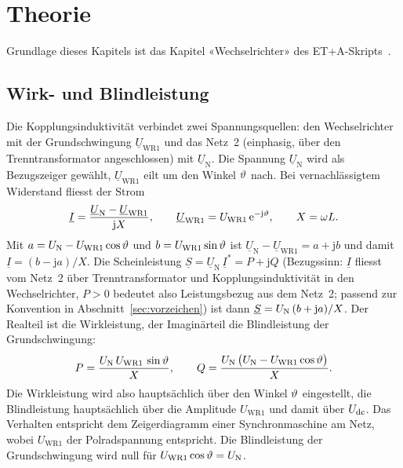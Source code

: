 \section{Theorie}
\label{sec:theorie}

Grundlage dieses Kapitels ist das Kapitel «Wechselrichter» des ET+A-Skripts~\cite{skript}.

\subsection{Wirk- und Blindleistung}

Die Kopplungsinduktivität verbindet zwei Spannungsquellen: den Wechselrichter mit der Grundschwingung $\underline{U}_{\mathrm{WR1}}$ und das Netz~2 (einphasig, über den Trenntransformator angeschlossen) mit $\underline{U}_{\mathrm N}$. Die Spannung $\underline{U}_{\mathrm N}$ wird als Bezugszeiger gewählt, $\underline{U}_{\mathrm{WR1}}$ eilt um den Winkel $\vartheta$ nach. Bei vernachlässigtem Widerstand fliesst der Strom
\begin{equation}
  \underline{I} = \frac{\underline{U}_{\mathrm N}-\underline{U}_{\mathrm{WR1}}}{\mathrm{j}X},
  \qquad \underline{U}_{\mathrm{WR1}} = U_{\mathrm{WR1}}\,\mathrm{e}^{-\mathrm{j}\vartheta},
  \qquad X=\omega L .
\end{equation}
Mit $a=U_{\mathrm{N}}-U_{\mathrm{WR1}}\cos\vartheta$ und $b=U_{\mathrm{WR1}}\sin\vartheta$ ist $\underline{U}_{\mathrm N}-\underline{U}_{\mathrm{WR1}}=a+\mathrm{j}b$ und damit $\underline{I}=(b-\mathrm{j}a)/X$. Die Scheinleistung $\underline{S}=\underline{U}_{\mathrm N}\,\underline{I}^{*}=P+\mathrm{j}Q$ (Bezugssinn: $\underline I$ fliesst vom Netz~2 über Trenntransformator und Kopplungsinduktivität in den Wechselrichter, $P>0$ bedeutet also Leistungsbezug aus dem Netz~2; passend zur Konvention in Abschnitt~\ref{sec:vorzeichen}) ist dann $\underline{S}=U_{\mathrm{N}}\,(b+\mathrm{j}a)/X$. Der Realteil ist die Wirkleistung, der Imaginärteil die Blindleistung der Grundschwingung:
\begin{equation}
  P=\frac{U_{\mathrm{N}}\,U_{\mathrm{WR1}}\,\sin\vartheta}{X},
  \qquad
  Q=\frac{U_{\mathrm{N}}\,\bigl(U_{\mathrm{N}}-U_{\mathrm{WR1}}\cos\vartheta\bigr)}{X}.
  \label{eq:PQ}
\end{equation}
Die Wirkleistung wird also hauptsächlich über den Winkel $\vartheta$ eingestellt, die Blindleistung hauptsächlich über die Amplitude $U_{\mathrm{WR1}}$ und damit über $U_{\mathrm{dc}}$. Das Verhalten entspricht dem Zeigerdiagramm einer Synchronmaschine am Netz, wobei $U_{\mathrm{WR1}}$ der Polradspannung entspricht. Die Blindleistung der Grundschwingung wird null für $U_{\mathrm{WR1}}\cos\vartheta=U_{\mathrm{N}}$.

